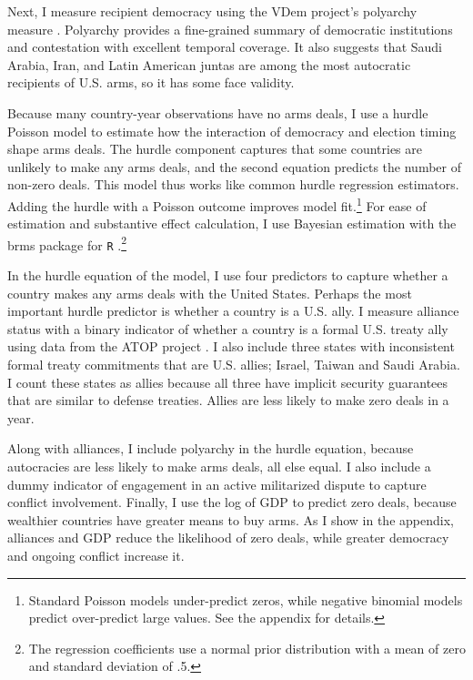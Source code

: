 \documentclass[12pt]{article}
\begin{document}
Next, I measure recipient democracy using the VDem project's polyarchy measure \citep{Coppedgeetal2008}. 
Polyarchy provides a fine-grained summary of democratic institutions and contestation with excellent temporal coverage.
It also suggests that Saudi Arabia, Iran, and Latin American juntas are among the most autocratic recipients of U.S. arms, so it has some face validity.  


Because many country-year observations have no arms deals, I use a hurdle Poisson model to estimate how the interaction of democracy and election timing shape arms deals.
The hurdle component captures that some countries are unlikely to make any arms deals, and the second equation predicts the number of non-zero deals.
This model thus works like common hurdle regression estimators.  
Adding the hurdle with a Poisson outcome improves model fit.\footnote{Standard Poisson models under-predict zeros, while negative binomial models predict over-predict large values. See the appendix for details.} 
For ease of estimation and substantive effect calculation, I use Bayesian estimation with the brms package for \texttt{R} \citep{Buerkner2017}.\footnote{The regression coefficients use a normal prior distribution with a mean of zero and standard deviation of .5.}


In the hurdle equation of the model, I use four predictors to capture whether a country makes any arms deals with the United States. 
Perhaps the most important hurdle predictor is whether a country is a U.S. ally. 
I measure alliance status with a binary indicator of whether a country is a formal U.S. treaty ally using data from the ATOP project \citep{Leedsetal2002}.
I also include three states with inconsistent formal treaty commitments that are U.S. allies; Israel, Taiwan and Saudi Arabia. 
I count these states as allies because all three have implicit security guarantees that are similar to defense treaties.
Allies are less likely to make zero deals in a year.  


Along with alliances, I include polyarchy in the hurdle equation, because autocracies are less likely to make arms deals, all else equal. 
I also include a dummy indicator of engagement in an active militarized dispute to capture conflict involvement. 
Finally, I use the log of GDP to predict zero deals, because wealthier countries have greater means to buy arms.
As I show in the appendix, alliances and GDP reduce the likelihood of zero deals, while greater democracy and ongoing conflict increase it. 
\end{document}
